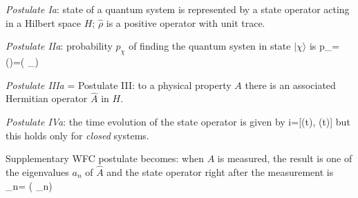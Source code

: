 \documentclass[12pt]{article}
\begin{document}
\emph{Postulate Ia}: state of a quantum system is represented
by a state operator acting in a Hilbert space $H$;
\(\hat{\rho}\) is a positive operator with unit trace.


\emph{Postulate IIa}: probability $p_{\chi}$ of finding the quantum
systen in state $|\chi\rangle$ is 
\be
p_{\chi}=\Tr(\hat{\rho}\op{\chi})=\Tr\left(\hat{\rho} _{\chi}\right)
\ee


\emph{Postulate IIIa} =  Postulate III: to a physical property
$A$ there is an associated Hermitian operator \(\hat{A}\)
in $H$.

\emph{Postulate IVa}: the time evolution of the state operator
is given by
\be
i\hbar {}=[(t), \hat{\rho}(t)]
\ee
but this holds only for \emph{closed} systems.

Supplementary WFC postulate becomes: when \(A\) is
measured, the result is one of the eigenvalues $a_n$ of \(\hat{A}\)
and the state operator right after the measurement is
\be
\hat{\rho} \rightarrow \hat{\rho}_{n}=
{\Tr\left(\hat{\rho} _{n}\right)}
\ee
\end{document}

